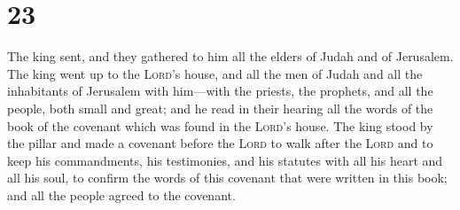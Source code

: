 \hypertarget{section-22}{%
\section{23}\label{section-22}}

 The king sent, and they gathered to him all the elders of
Judah and of Jerusalem.  The king went up to the
\textsc{Lord}'s house, and all the men of Judah and all the inhabitants
of Jerusalem with him---with the priests, the prophets, and all the
people, both small and great; and he read in their hearing all the words
of the book of the covenant which was found in the \textsc{Lord}'s
house.  The king stood by the pillar and made a covenant
before the \textsc{Lord} to walk after the \textsc{Lord} and to keep his
commandments, his testimonies, and his statutes with all his heart and
all his soul, to confirm the words of this covenant that were written in
this book; and all the people agreed to the covenant.

